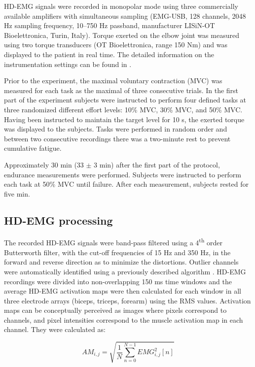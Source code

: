 HD-EMG signals were recorded in monopolar mode using three commercially available amplifiers with simultaneous sampling (EMG-USB, 128 channels, 2048 Hz sampling frequency, 10–750 Hz passband, manufacturer LISiN-OT Bioelettronica, Turin, Italy). Torque exerted on the elbow joint was measured using two torque transducers (OT Bioelettronica, range 150 Nm) and was displayed to the patient in real time. The detailed information on the instrumentation settings can be found in \citep{Rojas-Martinez2012}.

Prior to the experiment, the maximal voluntary contraction (MVC) was measured for each task as the maximal of three consecutive trials. In the first part of the experiment subjects were instructed to perform four defined tasks at three randomized different effort levels: 10\% MVC, 30\% MVC, and 50\% MVC. Having been instructed to maintain the target level for 10 s, the exerted torque was displayed to the subjects. Tasks were performed in random order and between two consecutive recordings there was a two-minute rest to prevent cumulative fatigue.

Approximately 30 min (33 $\pm$ 3 min) after the first part of the protocol, endurance measurements were performed. Subjects were instructed to perform each task at 50\% MVC until failure. After each measurement, subjects rested for five min.

\subsection{HD-EMG processing}
The recorded HD-EMG signals were band-pass filtered using a 4\textsuperscript{th} order Butterworth filter, with the cut-off frequencies of 15 Hz and 350 Hz, in the forward and reverse direction as to minimize the distortions. Outlier channels were automatically identified using a previously described algorithm \citep{Rojas-Martinez2012}.
HD-EMG recordings were divided into non-overlapping 150 ms time windows and the average HD-EMG activation maps were then calculated for each window in all three electrode arrays (biceps, triceps, forearm) using the RMS values. Activation maps can be conceptually perceived as images where pixels correspond to channels, and pixel intensities correspond to the muscle activation map in each channel. They were calculated as:

\begin{equation} \label{eq:3-1}
AM_{i,j} = \sqrt{\frac{1}{N} \sum_{n=0}^{N-1} EMG_{i,j}^{2}[n] }
\end{equation}

